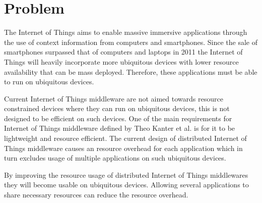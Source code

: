 \section{Problem}
The Internet of Things aims to enable massive immersive applications through the use of context information from computers and smartphones. Since the sale of smartphones surpassed that of computers and laptops in 2011 \cite{canalsys} the Internet of Things will heavily incorporate more ubiquitous devices with lower resource availability that can be mass deployed. Therefore, these applications must be able to run on ubiquitous devices.

Current Internet of Things middleware are not aimed towards resource constrained devices where they can run on ubiquitous devices, this is not designed to be efficient on such devices. One of the main requirements for Internet of Things middleware defined by Theo Kanter et al. \cite{Kanter539187} is for it to be lightweight and resource efficient. The current design of distributed Internet of Things middleware causes an resource overhead for each application which in turn excludes usage of multiple applications on such ubiquitous devices. 

By improving the resource usage of distributed Internet of Things middlewares they will become usable on ubiquitous devices. Allowing several applications to share necessary resources can reduce the resource overhead. 


